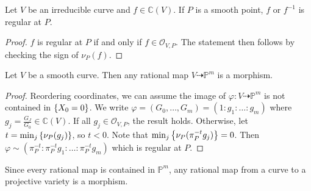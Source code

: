 \begin{corollary}
    Let \( V \) be an irreducible curve and \( f \in \mathbb C(V) \).
    If \( P \) is a smooth point, \( f \) or \( f^{-1} \) is regular at \( P \).
\end{corollary}
\begin{proof}
    \( f \) is regular at \( P \) if and only if \( f \in \mathcal O_{V,P} \).
    The statement then follows by checking the sign of \( \nu_P(f) \).
\end{proof}
\begin{corollary}
    Let \( V \) be a smooth curve.
    Then any rational map \( V \dashrightarrow \mathbb P^m \) is a morphism.
\end{corollary}
\begin{proof}
    Reordering coordinates, we can assume the image of \( \varphi \colon V \dashrightarrow \mathbb P^m \) is not contained in \( \qty{X_0 = 0} \).
    We write \( \varphi = (G_0, \dots, G_m) = (1 : g_1 : \dots : g_m) \) where \( g_j = \frac{G_J}{G_0} \in \mathbb C(V) \).
    If all \( g_j \in \mathcal O_{V,P} \), the result holds.
    Otherwise, let \( t = \min_j \qty{\nu_P(g_j)} \), so \( t < 0 \).
    Note that \( \min_j \qty{\nu_P(\pi_P^{-t} g_j)} = 0 \).
    Then \( \varphi \sim (\pi_P^{-t} : \pi_P^{-t} g_1 : \dots : \pi_P^{-t} g_m) \) which is regular at \( P \).
\end{proof}
Since every rational map is contained in \( \mathbb P^m \), any rational map from a curve to a projective variety is a morphism.

